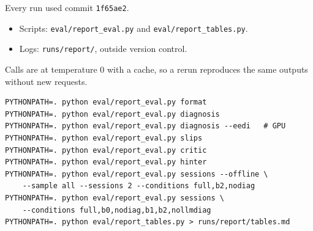 \documentclass[11pt,a4paper]{article}
\newcommand{\code}[1]{\texttt{#1}}
\begin{document}
Every run used commit \code{1f65ae2}.
\begin{itemize}
  \item Scripts: \code{eval/report\_eval.py} and \code{eval/report\_tables.py}.
  \item Logs: \code{runs/report/}, outside version control.
\end{itemize}
Calls are at temperature 0 with a cache, so a rerun reproduces the same outputs without new requests.

\begin{small}
\begin{verbatim}
PYTHONPATH=. python eval/report_eval.py format
PYTHONPATH=. python eval/report_eval.py diagnosis
PYTHONPATH=. python eval/report_eval.py diagnosis --eedi   # GPU
PYTHONPATH=. python eval/report_eval.py slips
PYTHONPATH=. python eval/report_eval.py critic
PYTHONPATH=. python eval/report_eval.py hinter
PYTHONPATH=. python eval/report_eval.py sessions --offline \
    --sample all --sessions 2 --conditions full,b2,nodiag
PYTHONPATH=. python eval/report_eval.py sessions \
    --conditions full,b0,nodiag,b1,b2,nollmdiag
PYTHONPATH=. python eval/report_tables.py > runs/report/tables.md
\end{verbatim}
\end{small}
\end{document}
